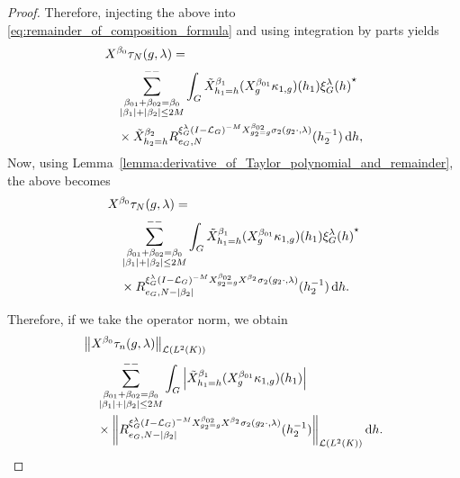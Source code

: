 \begin{proof}
    Therefore,
    injecting the above into \eqref{eq:remainder_of_composition_formula} and using integration by parts yields
    \begin{align*}
        &\LeftDifferentialOperator {\beta_0} \tau_N(g, \lambda) =\\
        &\quad \lcsum{%
            \substack{%
                \beta_{01} + \beta_{02} = \beta_0\\
                \abs {\beta_1} + \abs {\beta_2} \leq 2 M
            }
        }
        \int_\Group \RightDifferentialOperator[h_1 = h] {\beta_1} (\LeftDifferentialOperator [g] {\beta_{01}} \kappa_{1, g})(h_1) \adj {\Rep \lambda(h)}\\
        &\quad \times
        \RightDifferentialOperator[h_2 = h] {\beta_2} \TaylorRemainder {\Rep \lambda \BesselPotentialSquared {-M} \LeftDifferentialOperator [g_2 = g] {\beta_{02}} \sigma_2(g_2 \dummy, \lambda)} {e_\Group} N (h_2^{-1}) \dd h,
    \end{align*}
    Now, using Lemma~\ref{lemma:derivative_of_Taylor_polynomial_and_remainder},
    the above becomes
    \begin{align*}
        &\LeftDifferentialOperator {\beta_0} \tau_N(g, \lambda) =\\
        &\quad \lcsum{%
            \substack{%
                \beta_{01} + \beta_{02} = \beta_0\\
                \abs {\beta_1} + \abs {\beta_2} \leq 2 M
            }
        }
        \int_\Group \RightDifferentialOperator[h_1 = h] {\beta_1} (\LeftDifferentialOperator [g] {\beta_{01}} \kappa_{1, g})(h_1) \adj {\Rep \lambda(h)}\\
        &\quad \times
        \TaylorRemainder {\Rep \lambda \BesselPotentialSquared {-M} \LeftDifferentialOperator [g_2 = g] {\beta_{02}} \LeftDifferentialOperator {\beta_2} \sigma_2(g_2 \dummy, \lambda)} {e_\Group} {N - \abs {\beta_2}} (h_2^{-1}) \dd h.
    \end{align*}

    Therefore,
    if we take the operator norm,
    we obtain
    \begin{align}
        &\norm [\Lin {\Lebesgue 2 \CompactGroup}] {\LeftDifferentialOperator {\beta_0} \tau_n(g, \lambda)} \notag\\
        &\quad \lcsum{%
            \substack{%
                \beta_{01} + \beta_{02} = \beta_0\\
                \abs {\beta_1} + \abs {\beta_2} \leq 2 M
            }
        }
        \int_\Group \abs {\RightDifferentialOperator[h_1 = h] {\beta_1} (\LeftDifferentialOperator [g] {\beta_{01}} \kappa_{1, g})(h_1)} \notag\\
        &\quad \times
        \norm [\Lin {\Lebesgue 2 \CompactGroup}] {%
            \TaylorRemainder {\Rep \lambda \BesselPotentialSquared {-M} \LeftDifferentialOperator [g_2 = g] {\beta_{02}} \LeftDifferentialOperator {\beta_2} \sigma_2(g_2 \dummy, \lambda)} {e_\Group} {N - \abs {\beta_2}} (h_2^{-1})
        } \dd h.
        \label{eq:composition_formula:main_bound_for_negative_order}
    \end{align}


\end{proof}
